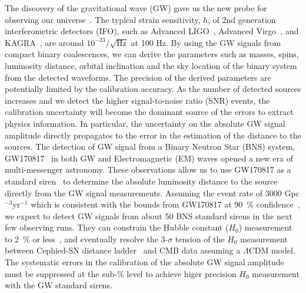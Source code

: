 \documentclass[%
 reprint,
superscriptaddress,
 amsmath,amssymb,
 aps,
]{revtex4-1}
\begin{document}
The discovery of the gravitational wave (GW) gave us the new probe for observing our universe~\cite{PhysRevLett.116.061102}. 
The typical strain sensitivity, $h$, of 2nd generation interferometric detectors (IFO), such as Advanced LIGO~\cite{0264-9381-32-7-074001}, Advanced Virgo~\cite{0264-9381-32-2-024001}, and KAGRA~\cite{0264-9381-29-12-124007, PhysRevD.88.043007}, are around $10^{-23}/\sqrt{\mathrm{Hz}}$ at 100 Hz. 
By using the GW signals from compact binary coalescences, we can derive 
the parameters such as masses, spins, luminosity distance, orbital inclination 
and the sky location of the binary system from the detected waveforms. 
The precision of the derived parameters are potentially limited by the 
calibration accuracy. As the number of detected sources increases and we 
detect the higher signal-to-noise ratio (SNR) events, the calibration uncertainty 
will become the dominant source of the errors to extract physics information. 
In particular, the uncertainty on the absolute GW signal amplitude directly 
propagates to the error in the estimation of the distance to the sources. 
The detection of GW signal from a Binary Neutron Star (BNS) system, 
GW170817~\cite{GW170817:2017aa} in both GW and Electromagnetic (EM) 
waves opened a new era of multi-messenger astronomy. These observations 
allow us to use GW170817 as a standard 
siren~\cite{Abbott:2017xzu,Schutz_1986,Holz_2005,Nissanke_2010} to 
determine the absolute luminosity distance to the source directly from the 
GW signal measurements. Assuming the event rate of 3000 Gpc$^{-3}$yr$^{-1}$ 
which is consistent with the bounds from GW170817 at 90~\% 
confidence~\cite{GW170817:2017aa}, we expect to detect GW signals from about 
50 BNS standard sirens in the next few observing runs. 
They can constrain the Hubble constant ($H_0$) 
measurement to 2~\% or less~\cite{Feeney:2018mkj}, and eventually resolve 
the 3-$\sigma$ tension of the $H_0$ measurement between Cephied-SN distance 
ladder~\cite{Riess_2016} and CMB data assuming a $\Lambda$CDM 
model.~\cite{2016-planck} The systematic errors in the calibration of 
the absolute GW signal amplitude must be suppressed at the sub-\% level to 
achieve higer precision $H_0$ measurement with the GW standard sirens.

\end{document}
